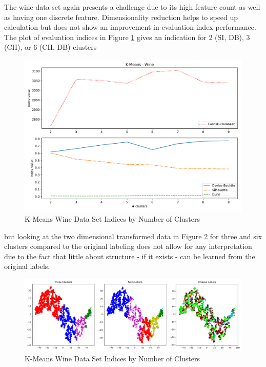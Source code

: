 The wine data set again presents a challenge due to its high feature count as well as having one discrete feature. Dimensionality reduction helps to speed up calculation but does not show an improvement in evaluation index performance. The plot of evaluation indices in Figure \ref{fig:kmeans_wine_indices_comparison} gives an indication for 2 (\gls{SI}, \gls{DB}), 3 (\gls{CH}), or 6 (\gls{CH}, \gls{DB}) clusters

\begin{figure}[H]
\begin{center}
\includegraphics[width=1.0\textwidth]{images/kmeans_wine_index_plot.pdf}
\end{center}
\caption{K-Means Wine Data Set Indices by Number of Clusters}
\label{fig:kmeans_wine_indices_comparison}
\end{figure}

but looking at the two dimensional transformed data in Figure \ref{fig:kmeans_wine_tsne} for three and six clusters compared to the original labeling does not allow for any interpretation due to the fact that little about structure - if it exists - can be learned from the original labels.




\begin{figure}[H]
\begin{center}
\includegraphics[width=1.0\textwidth]{images/kmeans_wine_tsne.pdf}
\end{center}
\caption{K-Means Wine Data Set Indices by Number of Clusters}
\label{fig:kmeans_wine_tsne}
\end{figure}

